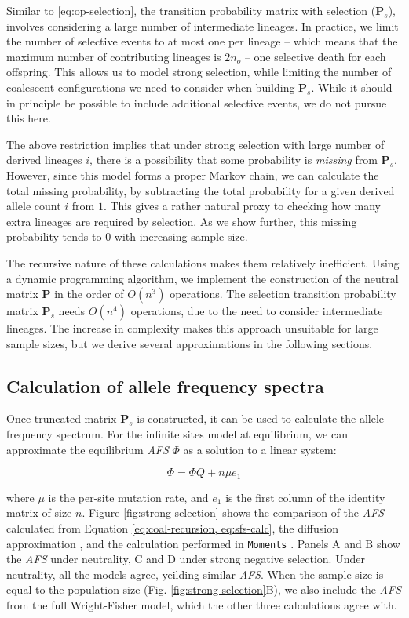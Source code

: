 \documentclass[review]{elsarticle}
\begin{document}
Similar to \eqref{eq:op-selection}, the transition probability matrix with selection
($\mathbf{P}_s$), involves considering a large number of intermediate lineages. In practice, we
limit the number of selective events to at most one per lineage -- which means that the maximum
number of contributing lineages is $2n_o$ -- one selective death for each offspring. This allows us
to model strong selection, while limiting the number of coalescent configurations we need to
consider when building $\mathbf{P}_s$. While it should in principle be possible to include
additional selective events, we do not pursue this here.

The above restriction implies that under strong selection with large number of derived lineages $i$,
there is a possibility that some probability is \textit{missing} from $\mathbf{P}_s$. However, since
this model forms a proper Markov chain, we can calculate the total missing probability, by
subtracting the total probability for a given derived allele count $i$ from $1$. This gives a rather
natural proxy to checking how many extra lineages are required by selection. As we show further,
this missing probability tends to $0$ with increasing sample size.

The recursive nature of these calculations makes them relatively inefficient. Using a dynamic
programming algorithm, we implement the construction of the neutral matrix $\mathbf{P}$ in the order
of $O(n^3)$ operations. The selection transition probability matrix $\mathbf{P}_s$ needs $O(n^4)$
operations, due to the need to consider intermediate lineages. The increase in complexity makes this
approach unsuitable for large sample sizes, but we derive several approximations in the following
sections.

\subsection{Calculation of allele frequency spectra}
\label{subsec:afs}

Once truncated matrix $\mathbf{P}_s$ is constructed, it can be used to calculate the allele
frequency spectrum. For the infinite sites model at equilibrium, we can approximate the equilibrium
\textit{AFS} $\Phi$ as a solution to a linear system:

\begin{equation}
  \label{eq:sfs-calc}
  \Phi = \Phi Q + n \mu e_1
\end{equation}

where $\mu$ is the per-site mutation rate, and $e_1$ is the first column of the identity matrix of
size $n$. Figure \ref{fig:strong-selection} shows the comparison of the \textit{AFS} calculated from
Equation \eqref{eq:coal-recursion, eq:sfs-calc}, the diffusion approximation \cite[eq.
9.23]{Ewens2004}, and the calculation performed in \texttt{Moments} \citep{JouganousEtAl2017}.
Panels A and B show the \textit{AFS} under neutrality, C and D under strong negative selection.
Under neutrality, all the models agree, yeilding similar \textit{AFS}. When the sample size is equal
to the population size (Fig. \ref{fig:strong-selection}B), we also include the \textit{AFS} from the
full Wright-Fisher model, which the other three calculations agree with.
\end{document}
